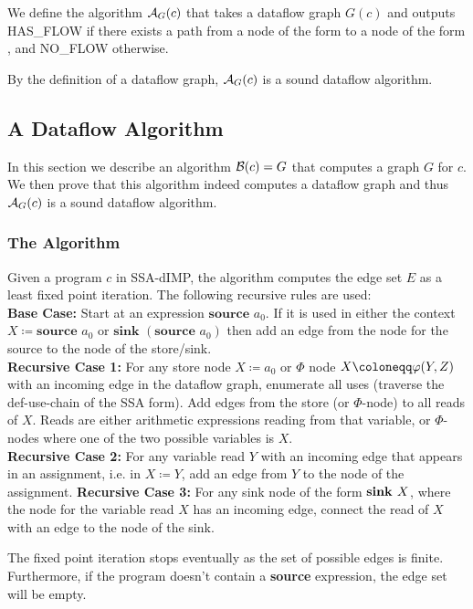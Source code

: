 \begin{definition}
    We define the algorithm $\operatorname{\mathcal{A}}_{G}(c)$ that takes a dataflow graph $G(c)$
    and outputs HAS\_FLOW if there exists a path from a node of the form 
    to a node of the form , and NO\_FLOW otherwise.
\end{definition}
\begin{remark}
    By the definition of a dataflow graph, $\operatorname{\mathcal{A}}_G(c)$ is a sound dataflow algorithm.
\end{remark}

\subsection{A Dataflow Algorithm}
In this section we describe an algorithm $\operatorname{\mathcal{B}}(c) = G$ that computes a 
graph $G$ for $c$. We then prove that this algorithm indeed
computes a dataflow graph and thus $\operatorname{\mathcal{A}}_G(c)$ is a sound dataflow algorithm.

\subsubsection*{The Algorithm}
Given a program $c$ in SSA-dIMP, the algorithm computes
the edge set $E$ as a least fixed point iteration.
The following recursive rules are used:\\
\textbf{Base Case:} Start at an expression $\textbf{source }a_0$.
If it is used in either the context $X \coloneqq \textbf{source }a_0$
or $\textbf{sink }(\textbf{source }a_0)$ then add an edge from the node for the
source to the node of the store/sink.\\
\textbf{Recursive Case 1:} For any store node $X \coloneqq a_0$ or
$\Phi$ node $\phistore{X}{Y}{Z}$ with an incoming edge
in the dataflow graph, enumerate all uses (traverse
the def-use-chain of the SSA form). Add edges from the store (or $\Phi$-node)
to all reads of $X$.
Reads are either arithmetic expressions reading from that variable,
or $\Phi$-nodes where one of the two possible variables is $X$.\\
\textbf{Recursive Case 2:} For any variable read $Y$ with an incoming edge that appears in an 
assignment, i.e. in $X \coloneqq Y$, add an edge from $Y$ to the node of the assignment.
\textbf{Recursive Case 3:} For any sink node of the form $\textbf{sink }{X}$,
where the node for the variable read $X$ has an incoming edge, connect 
the read of $X$ with an edge to the node of the sink.

The fixed point iteration stops eventually as the set of possible edges is
finite. Furthermore, if the program doesn't contain a \textbf{source} expression,
the edge set will be empty.

